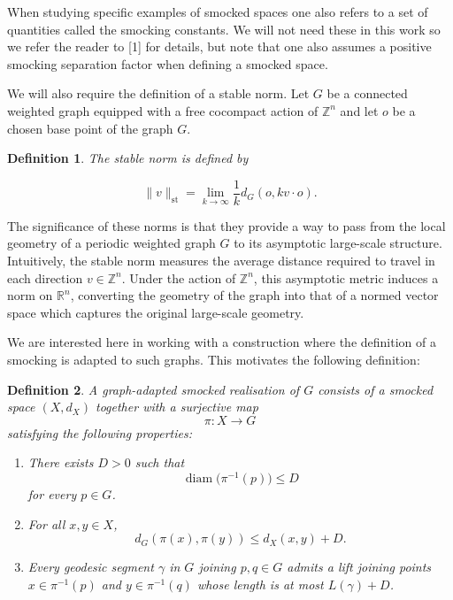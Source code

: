 \documentclass[12pt, letterpaper]{article}
\newtheorem{definition}{Definition}
\begin{document}
 


\noindent
When studying specific examples of smocked spaces one also refers to a set of quantities called the smocking constants.  We will not need these in this work so we refer the reader to [1] for details, but note that one also assumes a positive smocking separation factor when defining a smocked space.


We will also require the definition of a stable norm.  Let $G$ be a connected weighted graph equipped with a free cocompact action of $\mathbb Z^n$ and let $o$ be a chosen base point of the graph $G$. 

\begin{definition}
The stable norm is defined by

\[
\|v\|_{\mathrm{st}}
=
\lim_{k\to\infty}
\frac{1}{k}
d_G(o,kv\cdot o).
\]
\end{definition}

\noindent
The significance of these norms is that they provide a way to pass from the local geometry of a periodic weighted graph $G$ to its asymptotic large-scale structure.  Intuitively, the stable norm measures the average distance required to travel in each direction $v \in \mathbb{Z}^n$.  Under the action of $\mathbb{Z}^n$, this asymptotic metric induces a norm on $\mathbb{R}^n$, converting the geometry of the graph into that of a normed vector space which captures the original large-scale geometry.

We are interested here in working with a construction where the definition of a smocking is adapted to such graphs.  This motivates the following definition:












\begin{definition}
A graph-adapted smocked realisation of $G$ consists of a smocked space
$(X,d_X)$ together with a surjective map
\[
\pi:X\to G
\]
satisfying the following properties:

\begin{enumerate}

\item[(A1)] There exists $D>0$ such that
\[
\operatorname{diam}\bigl(\pi^{-1}(p)\bigr)\le D
\]
for every $p\in G$.

\item[(A2)] For all $x,y\in X$,
\[
d_G(\pi(x),\pi(y))
\le d_X(x,y)+D.
\]

\item[(A3)] Every geodesic segment $\gamma$ in $G$ joining
$p,q\in G$ admits a lift joining points
$x\in\pi^{-1}(p)$ and $y\in\pi^{-1}(q)$
whose length is at most $L(\gamma)+D$.
\end{enumerate}
\end{definition}
\end{document}
